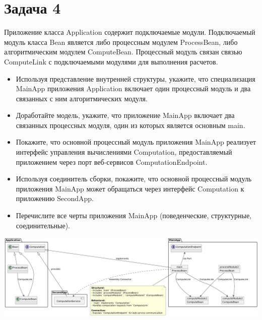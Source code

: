 \documentclass{article}
\begin{document}
\section{Задача 4}
Приложение класса Application содержит подключаемые модули. Подключаемый модуль класса Bean является либо процессным модулем ProcessBean, либо алгоритмическим модулем ComputeBean. Процессный модуль связан связью ComputeLink с подключаемыми модулями для выполнения расчетов.
\begin{itemize}
    \item Используя представление внутренней структуры, укажите, что специализация MainApp приложения Application включает один процессный модуль и два связанных с ним алгоритмических модуля.
    \item Доработайте модель, укажите, что приложение MainApp включает два связанных процессных модуля, один из которых является основным main.
    \item Покажите, что основной процессный модуль приложения MainApp реализует интерфейс управления вычислениями Computation, предоставляемый приложением через порт веб-сервисов ComputationEndpoint.
    \item Используя соединитель сборки, покажите, что основной процессный модуль приложения MainApp может обращаться через интерфейс Computation к приложению SecondApp.
    \item Перечислите все черты приложения MainApp (поведенческие, структурные, соединительные).
\end{itemize}

\includegraphics[width=\textwidth]{4.png}
\end{document}
